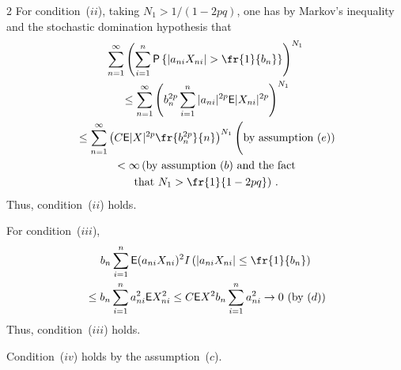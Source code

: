 \begin{multicols}{2}
For condition~($ii$), taking $N_1>1/(1-2pq)$, one has by Markov's inequality and the stochastic domination
hypothesis that
\begin{multline*}
\sum\limits_{n=1}^\infty \left(\sum\limits_{i=1}^n {\sf P}\left\{|a_{ni}X_{ni}|>\fr{1}{b_n}\right\} \right)^{N_1}\\
{}\le \sum\limits_{n=1}^\infty \left( b_n^{2p} \sum\limits_{i=1}^n |a_{ni}|^{2p} 
{\sf E}|X_{ni}|^{2p} \right)^{N_1} \\
{}\le \sum\limits_{n=1}^\infty \left(C {\sf E}|X|^{2p} \fr{b_n^{2p}}{n} \right)^{N_1} 
\Bigg( \mbox{by assumption~($e$))} \\
{}< \infty \left(
\vphantom{\fr{1}{pq}}\mbox{by assumption~($b$) and the fact}\right.\\
\left.\mbox{that } N_1>\fr{1}{1-2pq}\right)\,.
\end{multline*}
Thus, condition~($ii$) holds.

For condition~($iii$),
\begin{multline*}
 b_n \sum\limits_{i=1}^n {\sf E}(a_{ni}X_{ni})^2I\left(\left|a_{ni}X_{ni}\right|\le \fr{1}{b_n}\right)\\
{}  \le b_n\sum\limits_{i=1}^n a_{ni}^2 {\sf E} X_{ni}^2 
\le C {\sf E} X^2 b_n \sum\limits_{i=1}^n a_{ni}^2\to 0 \mbox{ (by ($d$))}
\end{multline*}
Thus, condition~($iii$) holds.

Condition~($iv$) holds by the assumption~($c$).


\end{multicols}
